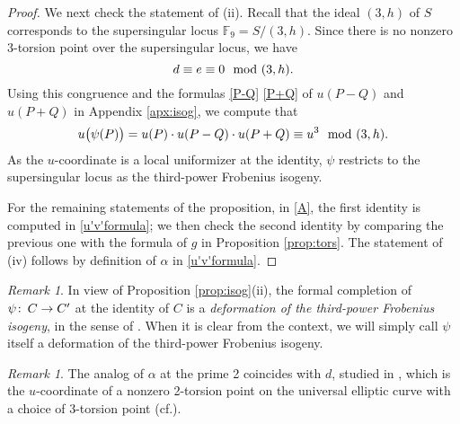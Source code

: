 \documentclass{gtpart}
\theoremstyle{definition}
\theoremstyle{remark}
\newtheorem{rmk}[thm]{Remark}
\def\co{\colon\thinspace}
\newcommand{\mb}[1]{\mathbb{#1}}
\newcommand{\cf}{cf.\thinspace}
\newcommand{\BF}{{\mb F}}
\newcommand{\md}{~~{\rm mod}~}
\newcommand{\A}{\alpha}
\newcommand{\isog}[1]{Proposition \ref{prop:isog}\thinspace (#1)}
\begin{document}
\begin{proof}
 We next check the statement of (ii).  
 Recall that the ideal $(3,h)$ of $S$ corresponds to the supersingular locus $\BF_9 = S / (3,h)$.  
 Since there is no nonzero 3-torsion point over the supersingular locus, we have 
 \[
  d \equiv e \equiv 0 \md (3,h).  
 \]
 Using this congruence and the formulas \eqref{P-Q} \eqref{P+Q} of $u(P-Q)$ and $u(P+Q)$ in Appendix \ref{apx:isog}, we compute that 
 \begin{equation}
 \label{deffrob}
  u\big(\psi(P)\big) = u(P) \cdot u(P-Q) \cdot u(P+Q) \equiv u^3 \md (3,h).  
 \end{equation}
 As the $u$-coordinate is a local uniformizer at the identity, $\psi$ restricts to the supersingular locus as the third-power Frobenius isogeny.  

 For the remaining statements of the proposition, 
 in \eqref{A}, the first identity is computed in \eqref{u'v'formula}; 
 we then check the second identity by comparing the previous one with the formula of $g$ in Proposition \ref{prop:tors}.  
 The statement of (iv) follows by definition of $\A$ in \eqref{u'v'formula}.  
\end{proof}

\begin{rmk}
 In view of \isog{ii}, the formal completion of $\psi \co C \to C'$ at the identity of $C$ 
 is a {\em deformation of the third-power Frobenius isogeny}, in the sense of \cite[11.3]{cong}.  
 When it is clear from the context, we will simply call $\psi$ itself a deformation of the third-power Frobenius isogeny.  
\end{rmk}

\begin{rmk}
\label{rmk:A}
 The analog of $\A$ at the prime 2 coincides with $d$, studied in \cite[Section 3]{h2p2}, 
 which is the $u$-coordinate of a nonzero 2-torsion point on the universal elliptic curve with a choice of 3-torsion point 
 (\cf \cite[Proposition 3.2]{tmf3}).  
\end{rmk}
\end{document}
